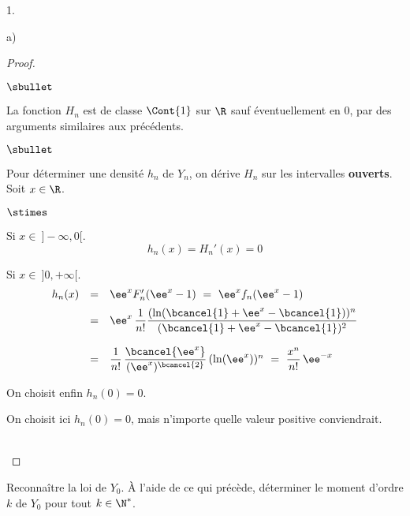 \documentclass[11pt]{article}%
\begin{document}
\begin{noliste}{1.}
\begin{noliste}{a)}
\begin{proof}
\begin{noliste}{$\sbullet$}
  \item La fonction $H_n$ est de classe $\Cont{1}$ sur $\R$ sauf 
  éventuellement en $0$, par des arguments similaires aux précédents.
 \end{noliste}
 
 \begin{noliste}{$\sbullet$}
 \item Pour déterminer une densité $h_n$ de $Y_n$, on dérive $H_n$ sur
   les intervalles {\bf ouverts}. Soit $x \in \R$.
  \begin{noliste}{$\stimes$}
    \item Si $x\in \ ]-\infty,0[$.
    \[
     h_n(x)=H_n'(x)=0
    \]
    
    \item Si $x\in \ ]0,+\infty[$.
    \[
     \begin{array}{rcl}
      h_n(x) & = & \ee^x F_n'(\ee^x-1) \ = \ \ee^x f_n(\ee^x-1)
      \\[.2cm]
      & = & \ee^x \, \dfrac{1}{n!} \dfrac{(\ln(\bcancel{1}+\ee^x -
      \bcancel{1}))^n}{(\bcancel{1}+\ee^x-\bcancel{1})^2}
      \\[.6cm]
      & = & \dfrac{1}{n!} \, \dfrac{\bcancel{\ee^x}} 
      {(\ee^x)^{\bcancel{2}}} \, (\ln(\ee^x))^n
      \ = \ \dfrac{x^n}{n!} \, \ee^{-x}
     \end{array}
    \]
    
  \item On choisit enfin $h_n(0)=0$.
  \end{noliste}
 \end{noliste}
 \begin{remark}
  On choisit ici $h_n(0)=0$, mais n'importe quelle valeur 
  positive conviendrait.
 \end{remark}~\\[-1.4cm]
\end{proof}


\newpage


\item Reconnaître la loi de $Y_0$. À l'aide de ce qui précède,
  déterminer le moment d'ordre $k$ de $Y_0$ pour tout $k \in \N^*$.


\end{noliste}
\end{noliste}
\end{document}
